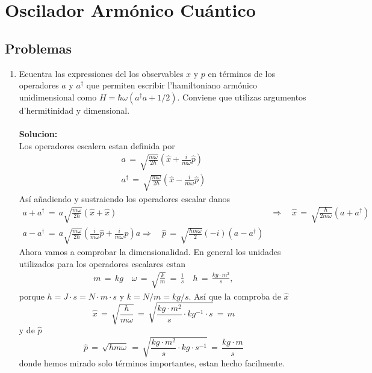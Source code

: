 \chapter{Oscilador Armónico Cuántico}

\section{Problemas}

\begin{enumerate}

\item Ecuentra las expressiones del los observables $x$ y $p$ en términos de los
operadores $a$ y $a^\dagger$ que permiten escribir l'hamiltoniano armónico
unidimensional como $H = \hbar \omega (a^\dagger a + 1/2)$. Conviene que
utilizas argumentos d'hermitinidad y dimensional.	\\\\
\textbf{Solucion:} \\
Los operadores escalera estan definida por
\begin{align*}
	a \,=\, \sqrt{\frac{m\omega}{2 \hbar}} \left( \hat x + \frac{i}{m \omega} \hat p
\right)	\\
	a^\dagger \,=\, \sqrt{\frac{m\omega}{2 \hbar}} \left( \hat x - \frac{i}{m \omega}
\hat p\right)
\end{align*}
Así añadiendo y sustraiendo los operadores escalar danos
\begin{align*}
	a + a^\dagger \,=\,a \sqrt{\frac{m \omega}{2 \hbar}} ( \hat x + \hat x) &
\Rightarrow \quad \hat x \,=\, \sqrt{\frac{\hbar }{2 m \omega}} (a + a^\dagger) \\
	a - a^\dagger \,=\,a \sqrt{\frac{m \omega}{2 \hbar}} \left(\frac{i}{m
\omega} \hat p + \frac{i}{m \omega} \hat p \right) a \Rightarrow \quad \hat p
\,=\, \sqrt{\frac{\hbar m \omega}{2}} (-i) (a - a^\dagger)
\end{align*}
Ahora vamos a comprobar la dimensionalidad. En general los unidades utilizados
para los operadores escalares estan
\begin{align*}
	m \,=\, kg \quad \omega \,=\, \sqrt{\frac{k}{m}} \,=\, \frac{1}{s} \quad h
\,=\, \frac{kg \cdot m^2}{s},
\end{align*}
porque $h = J\cdot s = N \cdot m \cdot s$ y $k = N / m = kg / s$. Así que la
comproba de $\hat x$
\begin{equation*}
	\hat x \,=\, \sqrt{\frac{h}{m \omega}} \,=\, \sqrt{\frac{kg \cdot m^2}{s} 
\cdot kg^{-1} \cdot s} \,=\, m
\end{equation*}
y de $\hat p$
\begin{equation*}
	\hat p \,=\, \sqrt{h m \omega} \,=\, \sqrt{\frac{kg \cdot m^2}{s} \cdot kg
\cdot s^{-1}} \,=\, \frac{kg \cdot m}{s}
\end{equation*}
donde hemos mirado solo términos importantes, estan hecho facilmente.


\end{enumerate}
